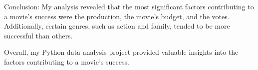\documentclass[11pt]{article}
\begin{document}
Conclusion: My analysis revealed that the most significant factors
contributing to a movie's success were the production, the movie's
budget, and the votes. Additionally, certain genres, such as action and
family, tended to be more successful than others.

Overall, my Python data analysis project provided valuable insights into
the factors contributing to a movie's success.


    
    
    
\end{document}
